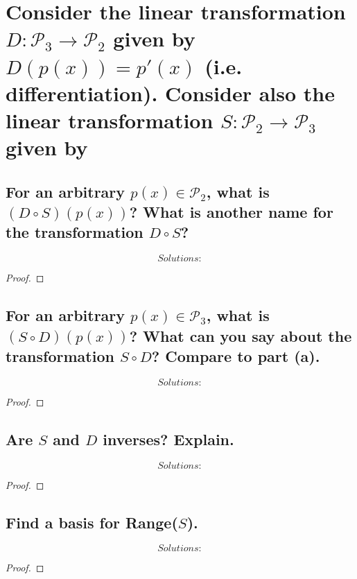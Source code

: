 \documentclass[../main.tex]{subfiles}
\begin{document}
\section[Problem 4]{Consider the linear transformation $D: \mathcal{P}_3 \to \mathcal{P}_2$ given by $D(p(x)) = p'(x)$ (i.e. differentiation). Consider also the linear transformation $S: \mathcal{P}_2 \to \mathcal{P}_3$ given by }
\subsection{For an arbitrary $p(x) \in \mathcal{P}_2$, what is $(D \circ S)(p(x))$? What is another name for the transformation $D \circ S$?}
\begin{equation*}
        \boxed{ Solutions:}
\end{equation*}
\begin{proof}
\end{proof}
\subsection{For an arbitrary $p(x) \in \mathcal{P}_3$, what is $(S \circ D)(p(x))$? What can you say about the transformation $S \circ D$? Compare to part (a).}
\begin{equation*}
        \boxed{ Solutions:}
\end{equation*}
\begin{proof}
\end{proof}
\subsection{Are $S$ and $D$ inverses? Explain.}
\begin{equation*}
        \boxed{ Solutions:}
\end{equation*}
\begin{proof}
\end{proof}
\subsection{Find a basis for Range($S$).}
\begin{equation*}
        \boxed{ Solutions:}
\end{equation*}
\begin{proof}
\end{proof}
\end{document}
